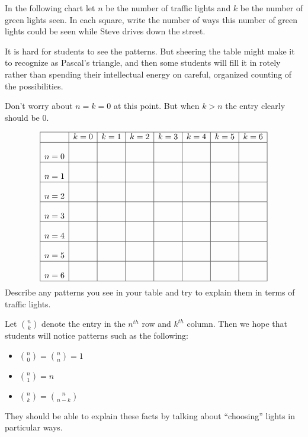 \begin{prob} 
In the following chart let $n$ be the number of traffic
lights and $k$ be  the number of green lights seen. In each square, write the number of ways this number of green lights could be seen while Steve drives down the street.
\newpage

\begin{teachingnote}
It is hard for students to see the patterns.  But sheering the table might make it to recognize as Pascal's triangle, and then some students will fill it in rotely rather than spending their intellectual energy on careful, organized counting of the possibilities.  

Don't worry about $n = k = 0$ at this point.  But when $k > n$ the entry clearly should be $0$. 
\end{teachingnote}
\[
\begin{array}{|c|c|c|c|c|c|c|c|}
    \hline
          & k=0 & k=1 & k=2 & k=3 & k=4 & k=5 & k = 6\\
    \hline
    n=0 &\rule[0mm]{0mm}{7mm}&       &       &       &       &   &   \\
    \hline
    n=1 &\rule[0mm]{0mm}{7mm}  &       &       &       &       &   &   \\
    \hline
    n=2 & \rule[0mm]{0mm}{7mm} &     &     &       &       &    &  \\
    \hline
    n=3 &\rule[0mm]{0mm}{7mm}       &       &       &       &       &   &   \\
    \hline
    n=4 & \rule[0mm]{0mm}{7mm}      &       &       &       &       &   &   \\
    \hline
    n=5 &\rule[0mm]{0mm}{7mm}       &       &       &       &       &   &   \\
    \hline
    n=6 &\rule[0mm]{0mm}{7mm}       &       &       &       &       &   &   \\
    \hline
\end{array}
\]
Describe any patterns you see in your table and try to explain them in
terms of traffic lights.
\begin{teachingnote}
Let $\binom{n}{k}$ denote the entry in the $n^{th}$ row and $k^{th}$ column.  Then we hope that students will notice patterns such as the following: 
\begin{itemize}
\item $\binom{n}{0} = \binom{n}{n} = 1$
\item $\binom{n}{1} = n$
\item $\binom{n}{k} = \binom{n}{n-k}$
\end{itemize}
They should be able to explain these facts by talking about ``choosing'' lights in particular ways.  
\end{teachingnote}
\end{prob}
